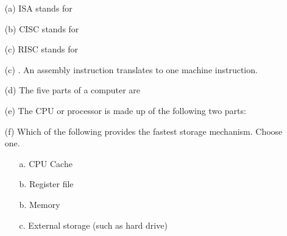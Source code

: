 \newpage
\nextq
\begin{itemize}

\item[(a)]
  ISA stands for
  
  \ANSWER\vspace{4mm}
  \begin{answercode}

  \end{answercode}

\item[(b)]
  CISC stands for
 
  \ANSWER\vspace{4mm}
  \begin{answercode}

  \end{answercode}

\item[(c)]
  RISC stands for
  \\
  \ANSWER\vspace{4mm}
  \begin{answercode}

  \end{answercode}
  
\item[(c)]
  \tf.
  An assembly instruction translates to one machine instruction.
  \\
  \ANSWER\vspace{4mm}
  \begin{answercode}

  \end{answercode}
  
\item[(d)]
  The five parts of a computer are
  \\
  \ANSWER\vspace{4mm}
  \begin{answercode}

  \end{answercode}

  
\item[(e)]
  The CPU or processor is made up of the following two parts:
  \\
  \ANSWER\vspace{4mm}
  \begin{answercode}

  \end{answercode}
  
\item[(f)]
  Which of the following provides the fastest
  storage mechanism. Choose one.
  \begin{itemize}
  \item[a.] CPU Cache
  \item[b.] Register file
  \item[b.] Memory
  \item[c.] External storage (such as hard drive)
  \end{itemize}
  \ANSWER\vspace{4mm}
  \begin{answercode}


\end{answercode}
\end{itemize}
